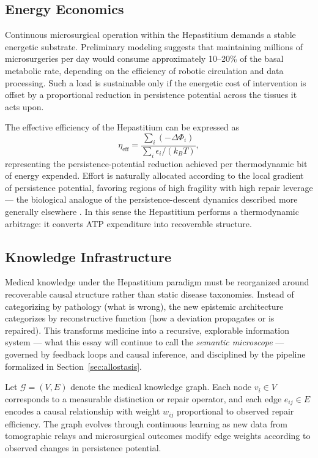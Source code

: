 \documentclass[12pt]{article}
\begin{document}
\subsection{Energy Economics}

Continuous microsurgical operation within the Hepastitium demands a stable energetic substrate. Preliminary modeling suggests that maintaining millions of microsurgeries per day would consume approximately 10--20\% of the basal metabolic rate, depending on the efficiency of robotic circulation and data processing. Such a load is sustainable only if the energetic cost of intervention is offset by a proportional reduction in persistence potential across the tissues it acts upon.

The effective efficiency of the Hepastitium can be expressed as
\begin{equation}
\eta_{\text{eff}} = \frac{\sum_i (-\Delta\Phi_i)}{\sum_i \epsilon_i / (k_B T)},
\label{eq:efficiency}
\end{equation}
representing the persistence-potential reduction achieved per thermodynamic bit of energy expended. Effort is naturally allocated according to the local gradient of persistence potential, favoring regions of high fragility with high repair leverage --- the biological analogue of the persistence-descent dynamics described more generally elsewhere \cite{flyxion2026persistence}. In this sense the Hepastitium performs a thermodynamic arbitrage: it converts ATP expenditure into recoverable structure.

\subsection{Knowledge Infrastructure}

Medical knowledge under the Hepastitium paradigm must be reorganized around recoverable causal structure rather than static disease taxonomies. Instead of categorizing by pathology (what is wrong), the new epistemic architecture categorizes by reconstructive function (how a deviation propagates or is repaired). This transforms medicine into a recursive, explorable information system --- what this essay will continue to call the \emph{semantic microscope} --- governed by feedback loops and causal inference, and disciplined by the pipeline formalized in Section~\ref{sec:allostasis}.

Let $\mathcal{G} = (V, E)$ denote the medical knowledge graph. Each node $v_i \in V$ corresponds to a measurable distinction or repair operator, and each edge $e_{ij} \in E$ encodes a causal relationship with weight $w_{ij}$ proportional to observed repair efficiency. The graph evolves through continuous learning as new data from tomographic relays and microsurgical outcomes modify edge weights according to observed changes in persistence potential.
\end{document}
